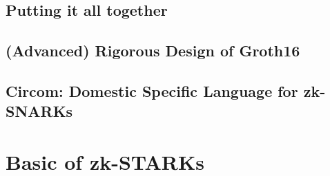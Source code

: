 \documentclass{article}
\begin{document}
\subsection{Putting it all together}

\subsection{(Advanced) Rigorous Design of Groth16}

\subsection{Circom: Domestic Specific Language for zk-SNARKs}

\section{Basic of zk-STARKs}


  
  


\appendix
\end{document}
